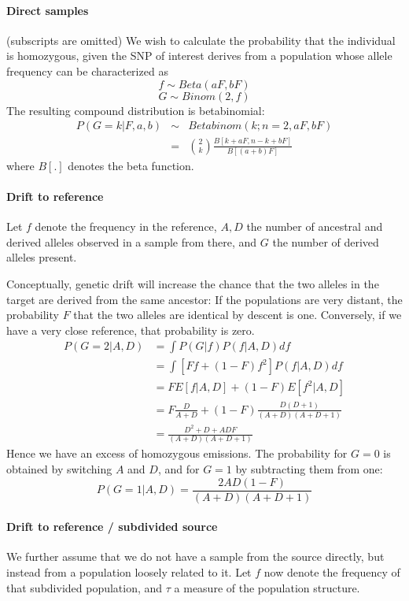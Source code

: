 \documentclass[10pt,a4paper]{article}
\begin{document}
\paragraph{Direct samples}
(subscripts are omitted) We wish to calculate the probability that the individual is homozygous, given the SNP of interest derives from a population whose allele frequency can be characterized as
$$f \sim Beta(aF, bF)$$
$$G \sim Binom(2, f)$$
The resulting compound distribution is  betabinomial:
\begin{eqnarray}
P(G=k | F, a, b) &\sim& Betabinom(k; n=2, aF, bF)\nonumber\\
&=& \binom{2}{k} \frac{B[k+a F, n-k + b F]}{B[ (a + b) F]} \label{eq:ll:homo}
\end{eqnarray}
where $B[.]$ denotes the beta function.
\paragraph{Drift to reference}
Let $f$ denote the frequency in the reference, $A, D$ the number of ancestral and derived alleles observed in a 
sample from there, and $G$ the number of derived alleles present.

Conceptually, genetic drift will increase the chance that the two alleles in the target are derived from the same ancestor: If the populations are very distant, the probability $F$ that the two alleles are identical by descent is one.  Conversely, if we have a very close reference, that probability is zero. 
\begin{align}
P(G=2 | A,D) &= \int P(G|f) P(f | A, D) df\nonumber\\
&= \int \left[ F f + (1-F) f^2\right] P(f | A, D) df\nonumber\\
&= F E[f|A, D] + (1-F)  E[f^2|A, D]\nonumber\\
&= F \frac{D}{A+D} + (1-F)  \frac{D (D+1)}{(A+D)(A+D+1)}\nonumber\\
&= \frac{D^2 + D + ADF}{(A+D)(A+D+1)}
\end{align}
Hence we have an excess of homozygous emissions. The probability for $G=0$ is obtained by switching $A$ and $D$, and for $G=1$ by subtracting them from one:
\begin{equation}
P(G=1 | A,D) = \frac{2AD(1-F)}{(A+D)(A+D+1)}
\end{equation} 

\paragraph{Drift to reference / subdivided source}
We further assume that we do not have a sample from the source directly, but instead from a population loosely related to it. Let $f$ now denote the frequency of that subdivided population, and $\tau$ a measure of the population structure. 
\end{document}
